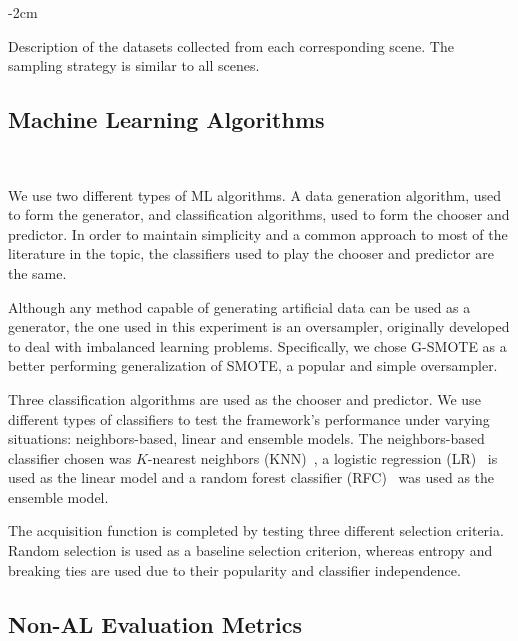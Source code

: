 \documentclass[preprint,12pt]{elsarticle}
\begin{document}
\begin{table}
    \centering
    \addtolength{\leftskip} {-2cm}
    \addtolength{\rightskip}{-2cm}
    \caption{\label{tab:datasets_description}
        Description of the datasets collected from each corresponding scene.
        The sampling strategy is similar to all scenes.
    }
\end{table}

\subsection{Machine Learning Algorithms}~\label{sec:machine_learning_algorithms}

We use two different types of ML algorithms. A data generation algorithm, used
to form the generator, and classification algorithms, used to form the chooser
and predictor. In order to maintain simplicity and a common approach to most of
the literature in the topic, the classifiers used to play the chooser and
predictor are the same.

Although any method capable of generating artificial data can be used as a
generator, the one used in this experiment is an oversampler, originally
developed to deal with imbalanced learning problems. Specifically, we chose
G-SMOTE as a better performing generalization of SMOTE, a popular and simple
oversampler.

Three classification algorithms are used as the chooser and predictor. We use
different types of classifiers to test the framework's performance under
varying situations: neighbors-based, linear and ensemble models. The
neighbors-based classifier chosen was $K$-nearest neighbors
(KNN)~\cite{Cover1967}, a logistic regression (LR)~\cite{Nelder1972} is used as
the linear model and a random forest classifier (RFC)~\cite{Ho1995} was used as
the ensemble model.

The acquisition function is completed by testing three different selection
criteria. Random selection is used as a baseline selection criterion, whereas
entropy and breaking ties are used due to their popularity and classifier
independence. 

\subsection{Non-AL Evaluation Metrics}~\label{sec:evaluation_metrics}
\end{document}
